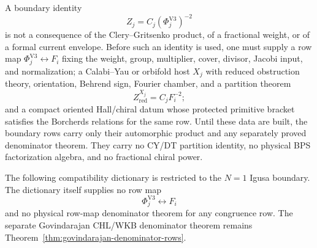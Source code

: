 \documentclass[11pt]{memoir}
\begin{document}
\begin{remark}
A boundary identity
$$
Z_j=C_j(\Phi^{\mathrm{V3}}_j)^{-2}
$$
is not a consequence of the Clery--Gritsenko product, of a fractional
weight, or of a formal current envelope.  Before such an identity is
used, one must supply a row map
\(\Phi^{\mathrm{V3}}_j\leftrightarrow F_i\) fixing the weight, group,
multiplier, cover, divisor, Jacobi input, and normalization; a
Calabi--Yau or orbifold host \(X_j\) with reduced
obstruction theory, orientation, Behrend sign, Fourier chamber, and a
partition theorem
$$
Z^{X_j}_{\mathrm{red}}=C_jF_i^{-2};
$$
and a compact oriented Hall/chiral datum whose protected primitive
bracket satisfies the Borcherds relations for the same row.  Until these
data are built, the boundary rows carry only their automorphic product
and any separately proved denominator theorem.  They carry no CY/DT
partition identity, no physical BPS factorization algebra, and no
fractional chiral power.
\end{remark}

The following compatibility dictionary is restricted to the $N=1$ Igusa
boundary.  The dictionary itself supplies no row map
$$\Phi^{\mathrm{V3}}_j\longleftrightarrow F_i$$
and no physical row-map denominator theorem for any congruence
row.  The separate Govindarajan CHL/WKB denominator theorem remains
Theorem~\ref{thm:govindarajan-denominator-rows}.





\end{document}
